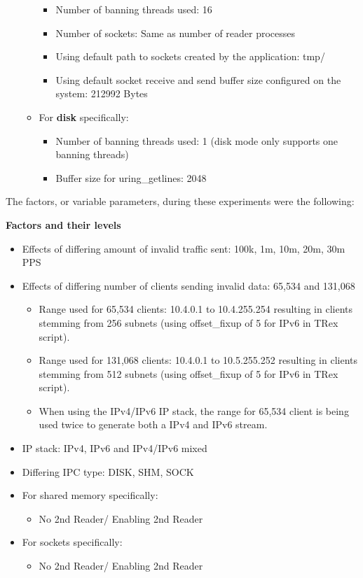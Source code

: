 \begin{itemize}
\begin{itemize}
\begin{itemize}
            \item Number of banning threads used\@: 16
            \item Number of sockets\@: Same as number of reader processes
            \item Using default path to sockets created by the application\@: tmp/
            \item Using default socket receive and send buffer size configured on the system\@: 212992 Bytes
        \end{itemize}
        \item For \textbf{disk} specifically\@:
        \begin{itemize}
            \item Number of banning threads used\@: 1 (disk mode only supports one banning threads)
            \item Buffer size for uring\_getlines\@: 2048
        \end{itemize}
    \end{itemize}
\end{itemize}

\bigskip
\noindent
The factors, or variable parameters, during these experiments were the following\@:

\bigskip
\noindent
\textbf{Factors and their levels}
\begin{itemize}
    \item Effects of differing amount of invalid traffic sent: 100k, 1m, 10m, 20m, 30m PPS
    \item Effects of differing number of clients sending invalid data: 65,534 and 131,068
    \begin{itemize}
        \item Range used for 65,534 clients: 10.4.0.1 to 10.4.255.254 resulting in clients stemming from 256 subnets (using offset\_fixup of 5 for IPv6 in TRex script).
        \item Range used for 131,068 clients: 10.4.0.1 to 10.5.255.252 resulting in clients stemming from 512 subnets (using offset\_fixup of 5 for IPv6 in TRex script).
        \item When using the IPv4/IPv6 IP stack, the range for 65,534 client is being used twice to generate both a IPv4 and IPv6 stream.
    \end{itemize}
    \item IP stack: IPv4, IPv6 and IPv4/IPv6 mixed
    \item Differing IPC type\@: DISK, SHM, SOCK
    \item For shared memory specifically:
    \begin{itemize}
        \item No 2nd Reader/ Enabling 2nd Reader
    \end{itemize}
    \item For sockets specifically:
    \begin{itemize}
        \item No 2nd Reader/ Enabling 2nd Reader
    \end{itemize}
\end{itemize}

